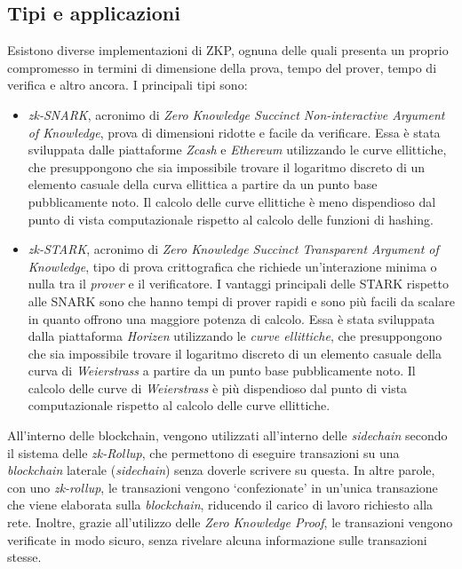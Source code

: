 \subsection{Tipi e applicazioni}\label{sec:zero-knowledge-proof-tipi-applicazioni}
Esistono diverse implementazioni di ZKP, ognuna delle quali presenta un proprio compromesso in termini di dimensione della prova, tempo del prover, tempo di verifica e altro ancora. 
I principali tipi sono: 
\begin{itemize}
    \item{\textit{zk-SNARK}}, acronimo di \textit{Zero Knowledge Succinct Non-interactive Argument of Knowledge}, prova di dimensioni ridotte e facile da verificare. Essa è stata sviluppata dalle piattaforme \textit{Zcash} e \textit{Ethereum} 
    utilizzando le curve ellittiche, che presuppongono che sia impossibile trovare il logaritmo discreto di un elemento casuale della curva ellittica a partire da un punto base pubblicamente noto. Il calcolo delle curve ellittiche è meno dispendioso dal punto di vista computazionale rispetto al calcolo delle funzioni di hashing.
    \item{\textit{zk-STARK}}, acronimo di \textit{Zero Knowledge Succinct Transparent Argument of Knowledge}, tipo di prova crittografica che richiede un'interazione minima o nulla tra il \textit{prover} e il verificatore. I vantaggi principali delle STARK rispetto alle SNARK sono che hanno tempi di prover rapidi e sono più facili da scalare in quanto offrono una maggiore potenza di calcolo.
    Essa è stata sviluppata dalla piattaforma \textit{Horizen} utilizzando le \textit{curve ellittiche}, che presuppongono che sia impossibile trovare il logaritmo discreto di un elemento casuale della curva di \textit{Weierstrass} a partire da un punto base pubblicamente noto. Il calcolo delle curve di \textit{Weierstrass} è più dispendioso dal punto di vista computazionale rispetto al calcolo delle curve ellittiche.
\end{itemize}

All'interno delle blockchain, vengono utilizzati all'interno delle \textit{sidechain} secondo il sistema delle \textit{zk-Rollup}, che permettono di eseguire transazioni su una \textit{blockchain} laterale (\textit{sidechain}) senza doverle scrivere su questa.
In altre parole, con uno \textit{zk-rollup}, le transazioni vengono `confezionate' in un'unica transazione che viene elaborata sulla \textit{blockchain}, riducendo il carico di lavoro richiesto alla rete. 
Inoltre, grazie all'utilizzo delle \textit{Zero Knowledge Proof}, le transazioni vengono verificate in modo sicuro, senza rivelare alcuna informazione sulle transazioni stesse.

